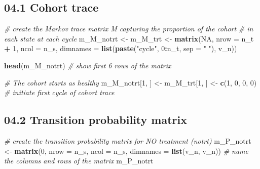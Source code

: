 \documentclass[
]{article}
\newenvironment{Shaded}{\begin{snugshade}}{\end{snugshade}}
\newcommand{\CommentTok}[1]{\textcolor[rgb]{0.56,0.35,0.01}{\textit{#1}}}
\newcommand{\DataTypeTok}[1]{\textcolor[rgb]{0.13,0.29,0.53}{#1}}
\newcommand{\DecValTok}[1]{\textcolor[rgb]{0.00,0.00,0.81}{#1}}
\newcommand{\KeywordTok}[1]{\textcolor[rgb]{0.13,0.29,0.53}{\textbf{#1}}}
\newcommand{\NormalTok}[1]{#1}
\newcommand{\OperatorTok}[1]{\textcolor[rgb]{0.81,0.36,0.00}{\textbf{#1}}}
\newcommand{\OtherTok}[1]{\textcolor[rgb]{0.56,0.35,0.01}{#1}}
\newcommand{\StringTok}[1]{\textcolor[rgb]{0.31,0.60,0.02}{#1}}
\begin{document}
\hypertarget{cohort-trace}{%
\subsection{04.1 Cohort trace}\label{cohort-trace}}

\begin{Shaded}
\begin{Highlighting}[]
\CommentTok{# create the Markov trace matrix M capturing the proportion of the cohort }
\CommentTok{# in each state at each cycle}
\NormalTok{m_M_notrt <-}\StringTok{ }\NormalTok{m_M_trt <-}\StringTok{ }\KeywordTok{matrix}\NormalTok{(}\OtherTok{NA}\NormalTok{, }
                               \DataTypeTok{nrow     =}\NormalTok{ n_t }\OperatorTok{+}\StringTok{ }\DecValTok{1}\NormalTok{, }\DataTypeTok{ncol =}\NormalTok{ n_s,}
                               \DataTypeTok{dimnames =} \KeywordTok{list}\NormalTok{(}\KeywordTok{paste}\NormalTok{(}\StringTok{"cycle"}\NormalTok{, }\DecValTok{0}\OperatorTok{:}\NormalTok{n_t, }\DataTypeTok{sep =} \StringTok{" "}\NormalTok{), v_n))}

\KeywordTok{head}\NormalTok{(m_M_notrt) }\CommentTok{# show first 6 rows of the matrix }

\CommentTok{# The cohort starts as healthy}
\NormalTok{m_M_notrt[}\DecValTok{1}\NormalTok{, ] <-}\StringTok{ }\NormalTok{m_M_trt[}\DecValTok{1}\NormalTok{, ] <-}\StringTok{ }\KeywordTok{c}\NormalTok{(}\DecValTok{1}\NormalTok{, }\DecValTok{0}\NormalTok{, }\DecValTok{0}\NormalTok{, }\DecValTok{0}\NormalTok{) }\CommentTok{# initiate first cycle of cohort trace }
\end{Highlighting}
\end{Shaded}

\hypertarget{transition-probability-matrix}{%
\subsection{04.2 Transition probability
matrix}\label{transition-probability-matrix}}

\begin{Shaded}
\begin{Highlighting}[]
\CommentTok{# create the transition probability matrix for NO treatment (notrt)}
\NormalTok{m_P_notrt  <-}\StringTok{ }\KeywordTok{matrix}\NormalTok{(}\DecValTok{0}\NormalTok{,}
                     \DataTypeTok{nrow =}\NormalTok{ n_s,}
                     \DataTypeTok{ncol =}\NormalTok{ n_s,}
                     \DataTypeTok{dimnames =} \KeywordTok{list}\NormalTok{(v_n, v_n)) }\CommentTok{# name the columns and rows of the matrix}
\NormalTok{m_P_notrt}
\end{Highlighting}
\end{Shaded}
\end{document}
